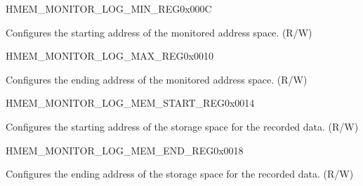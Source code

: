 \begin{register}{H}{MEM\_MONITOR\_LOG\_MIN\_REG}{0x000C}\label{regdesc:MEMMONITORLOGMINREG}
%
\regnewline%
\begin{regdesc}\begin{reglist}
\label{fielddesc:MEMMONITORLOGMIN}\item [MEM\_MONITOR\_LOG\_MIN] Configures the starting address of the monitored address space. (R/W)
\end{reglist}\end{regdesc}
\end{register}


\begin{register}{H}{MEM\_MONITOR\_LOG\_MAX\_REG}{0x0010}\label{regdesc:MEMMONITORLOGMAXREG}
%
\regnewline%
\begin{regdesc}\begin{reglist}
\label{fielddesc:MEMMONITORLOGMAX}\item [MEM\_MONITOR\_LOG\_MAX] Configures the ending address of the monitored address space. (R/W)
\end{reglist}\end{regdesc}
\end{register}

\begin{register}{H}{MEM\_MONITOR\_LOG\_MEM\_START\_REG}{0x0014}\label{regdesc:MEMMONITORLOGMEMSTARTREG}
%
\regnewline%
\begin{regdesc}\begin{reglist}
\label{fielddesc:MEMMONITORLOGMEMSTART}\item [MEM\_MONITOR\_LOG\_MEM\_START] Configures the starting address of the storage space for the recorded data. (R/W)
\end{reglist}\end{regdesc}
\end{register}


\begin{register}{H}{MEM\_MONITOR\_LOG\_MEM\_END\_REG}{0x0018}\label{regdesc:MEMMONITORLOGMEMENDREG}
%
\regnewline%
\begin{regdesc}\begin{reglist}
\label{fielddesc:MEMMONITORLOGMEMEND}\item [MEM\_MONITOR\_LOG\_MEM\_END] Configures the ending address of the storage space for the recorded data. (R/W)
\end{reglist}\end{regdesc}
\end{register}


